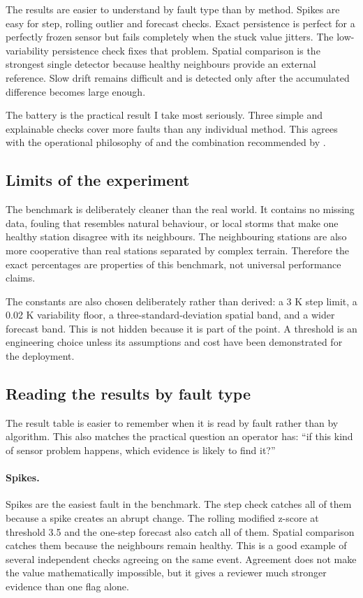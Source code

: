 The results are easier to understand by fault type than by method. Spikes
are easy for step, rolling outlier and forecast checks. Exact persistence is
perfect for a perfectly frozen sensor but fails completely when the stuck
value jitters. The low-variability persistence check fixes that problem.
Spatial comparison is the strongest single detector because healthy
neighbours provide an external reference. Slow drift remains difficult and
is detected only after the accumulated difference becomes large enough.

The battery is the practical result I take most seriously. Three simple and
explainable checks cover more faults than any individual method. This agrees
with the operational philosophy of \citet{shafer2000} and the combination
recommended by \citet{leigh2019}.

\subsection{Limits of the experiment}

The benchmark is deliberately cleaner than the real world. It contains no
missing data, fouling that resembles natural behaviour, or local storms that
make one healthy station disagree with its neighbours. The neighbouring
stations are also more cooperative than real stations separated by complex
terrain. Therefore the exact percentages are properties of this benchmark,
not universal performance claims.

The constants are also chosen deliberately rather than derived: a 3 K step
limit, a 0.02 K variability floor, a three-standard-deviation spatial band,
and a wider forecast band. This is not hidden because it is part of the
point. A threshold is an engineering choice unless its assumptions and cost
have been demonstrated for the deployment.


\subsection{Reading the results by fault type}

The result table is easier to remember when it is read by fault rather than
by algorithm. This also matches the practical question an operator has:
``if this kind of sensor problem happens, which evidence is likely to find
it?''

\paragraph{Spikes.}
Spikes are the easiest fault in the benchmark. The step check catches all of
them because a spike creates an abrupt change. The rolling modified z-score
at threshold 3.5 and the one-step forecast also catch all of them. Spatial
comparison catches them because the neighbours remain healthy. This is a
good example of several independent checks agreeing on the same event.
Agreement does not make the value mathematically impossible, but it gives a
reviewer much stronger evidence than one flag alone.

